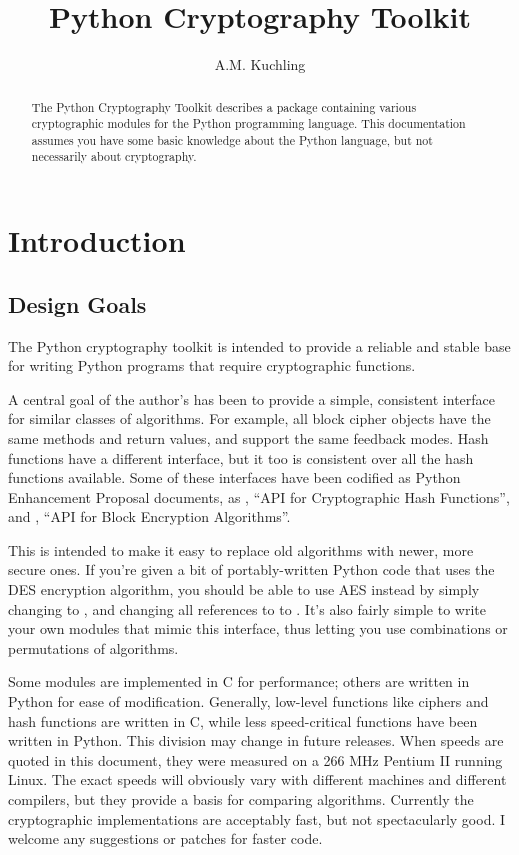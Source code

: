 \documentclass{howto}
\title{Python Cryptography Toolkit}
\author{A.M. Kuchling}
\begin{document}
\maketitle

\begin{abstract}
\noindent
The Python Cryptography Toolkit describes a package containing various
cryptographic modules for the Python programming language.  This
documentation assumes you have some basic knowledge about the Python
language, but not necessarily about cryptography.

\end{abstract}

\tableofcontents

\section{Introduction}

\subsection{Design Goals}
The Python cryptography toolkit is intended to provide a reliable and
stable base for writing Python programs that require cryptographic
functions.

A central goal of the author's has been to provide a simple,
consistent interface for similar classes of algorithms.  For example,
all block cipher objects have the same methods and return values, and
support the same feedback modes.  Hash functions have a different
interface, but it too is consistent over all the hash functions
available.  Some of these interfaces have been codified as Python
Enhancement Proposal documents, as , ``API for Cryptographic
Hash Functions'', and , ``API for Block Encryption
Algorithms''.  

This is intended to make it easy to replace old
algorithms with newer, more secure ones.  If you're given a bit of
portably-written Python code that uses the DES encryption algorithm,
you should be able to use AES instead by simply changing  to , and
changing all references to  to .  It's
also fairly simple to write your own modules that mimic this
interface, thus letting you use combinations or permutations of
algorithms.

Some modules are implemented in C for performance; others are written
in Python for ease of modification.  Generally, low-level functions
like ciphers and hash functions are written in C, while less
speed-critical functions have been written in Python.  This division
may change in future releases.  When speeds are quoted in this
document, they were measured on a 266 MHz Pentium II running Linux.
The exact speeds will obviously vary with different machines and
different compilers, but they provide a basis for comparing
algorithms.  Currently the cryptographic implementations are
acceptably fast, but not spectacularly good.  I welcome any
suggestions or patches for faster code.
\end{document}
